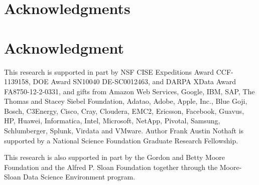 \documentclass[10pt,journal,compsoc]{IEEEtran}
\begin{document}



\ifCLASSOPTIONcompsoc
  \section*{Acknowledgments}
\else
  \section*{Acknowledgment}
\fi

This research is supported in part by NSF CISE Expeditions Award CCF-1139158, DOE Award SN10040 DE-SC0012463, and DARPA XData Award FA8750-12-2-0331, and gifts from Amazon Web Services, Google, IBM, SAP, The Thomas and Stacey Siebel Foundation, Adatao, Adobe, Apple, Inc., Blue Goji, Bosch, C3Energy, Cisco, Cray, Cloudera, EMC2, Ericsson, Facebook, Guavus, HP, Huawei, Informatica, Intel, Microsoft, NetApp, Pivotal, Samsung, Schlumberger, Splunk, Virdata and VMware. Author Frank Austin Nothaft is supported by a National Science Foundation Graduate Research Fellowship.

This research is also supported in part by the Gordon and Betty Moore
Foundation and the Alfred P. Sloan Foundation together through the
Moore-Sloan Data Science Environment program.


\ifCLASSOPTIONcaptionsoff
  \newpage
\fi



\end{document}
